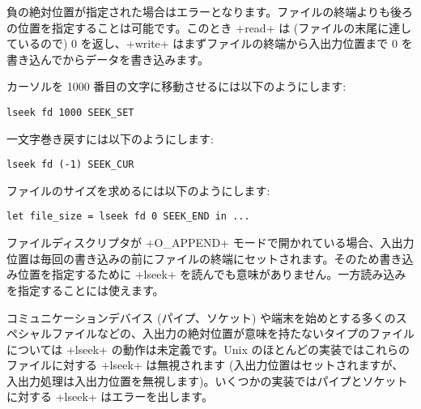 負の絶対位置が指定された場合はエラーとなります。ファイルの終端よりも後ろの位置を指定することは可能です。このとき \ml+read+ は (ファイルの末尾に達しているので) 0 を返し、\ml+write+ はまずファイルの終端から入出力位置まで 0 を書き込んでからデータを書き込みます。

\begin{example}
カーソルを 1000 番目の文字に移動させるには以下のようにします:
%
\begin{lstlisting}
lseek fd 1000 SEEK_SET
\end{lstlisting}
%
一文字巻き戻すには以下のようにします:
%
\begin{lstlisting}
lseek fd (-1) SEEK_CUR
\end{lstlisting}
%
ファイルのサイズを求めるには以下のようにします:
%
\begin{lstlisting}
let file_size = lseek fd 0 SEEK_END in ...
\end{lstlisting}
\end{example}

ファイルディスクリプタが \ml+O_APPEND+ モードで開かれている場合、入出力位置は毎回の書き込みの前にファイルの終端にセットされます。そのため書き込み位置を指定するために \ml+lseek+ を読んでも意味がありません。一方読み込みを指定することには使えます。

コミュニケーションデバイス (パイプ、ソケット) や端末を始めとする多くのスペシャルファイルなどの、入出力の絶対位置が意味を持たないタイプのファイルについては \ml+lseek+ の動作は未定義です。Unix のほとんどの実装ではこれらのファイルに対する \ml+lseek+ は無視されます (入出力位置はセットされますが、入出力処理は入出力位置を無視します)。いくつかの実装ではパイプとソケットに対する \ml+lseek+ はエラーを出します。

